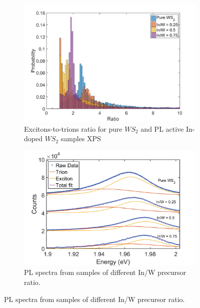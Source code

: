 \begin{figure}[H]
	\begin{center}
	\begin{subfigure}[b]{0.55\textwidth}
		\includegraphics[width=\textwidth]{In/PLRatioHistogram.png}
		\caption{Excitons-to-trions ratio for pure $WS_2$ and PL active In-doped $WS_2$ samples XPS}
		\label{fig:InPLRatioHistogram}
	\end{subfigure}
	\qquad
	\begin{subfigure}[b]{0.55\textwidth}
		\includegraphics[width=\textwidth]{In/allplotsfitted.png}
		\caption{PL spectra from samples of different In/W precursor ratio.}
		\label{fig:InPLRatioPlots}
	\end{subfigure}
	\end{center}
\end{figure}

